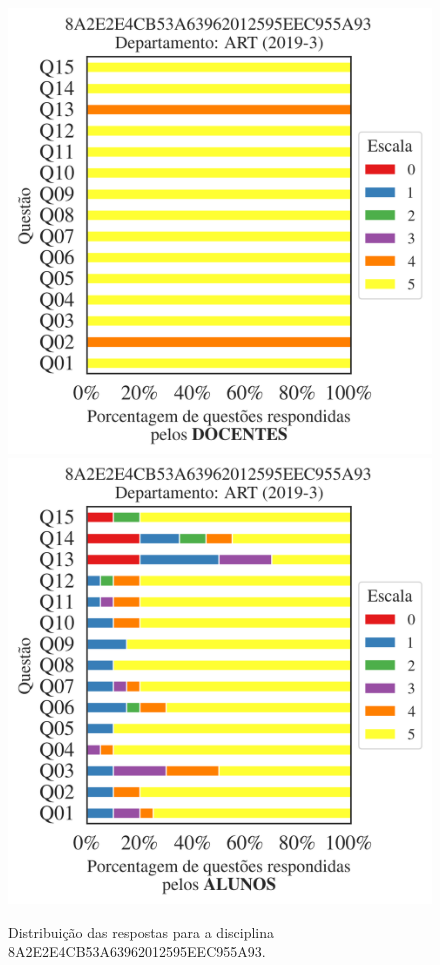 \documentclass[a4paper,10pt]{article}
\begin{document}
\begin{figure}[h]
\centering
\includegraphics[width=0.485\linewidth]{analise_disciplina_departamento_ART_8A2E2E4CB53A63962012595EEC955A93_docentes.png}
\includegraphics[width=0.485\linewidth]{analise_disciplina_departamento_ART_8A2E2E4CB53A63962012595EEC955A93_alunos.png}
\caption{\label{fig:analise_geral_departamento}                Distribuição das respostas para a disciplina 8A2E2E4CB53A63962012595EEC955A93. }
\end{figure}
\end{document}
